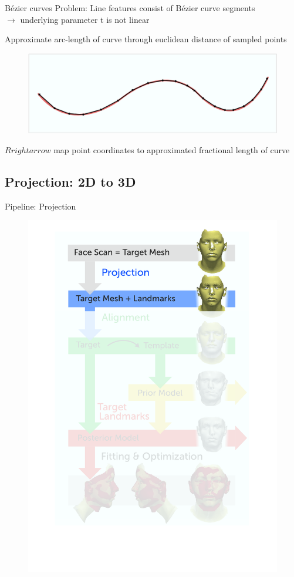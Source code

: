 \documentclass[xcolor=x11names,compress]{beamer}
\begin{document}
    \begin{frame}{B\'{e}zier curves}
        Problem: Line features consist of B\'{e}zier curve segments\\
        $\rightarrow$ underlying parameter t is not linear

        Approximate arc-length of curve through euclidean distance of sampled points\\
        \begin{figure}
            \centering
            \includegraphics[width=.7\textwidth]{../resources/figures/distance_computation.pdf}
        \end{figure}
        $Rrightarrow$ map point coordinates to approximated fractional length of curve
    \end{frame}

    \subsection{Projection: 2D to 3D}
    \begin{frame}{Pipeline: Projection}
        \begin{figure}   
            \centering
            \includegraphics[width=.6\textwidth]{../resources/figures/pipeline_projection.pdf}
        \end{figure}
    \end{frame}
\end{document}
